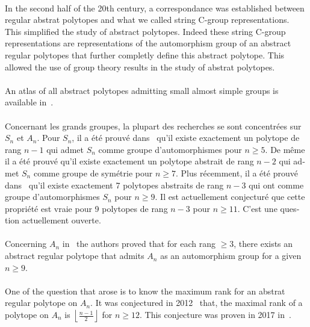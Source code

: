 \paragraph{}
In the second half of the 20th century, a correspondance was established between regular abstrat polytopes and what we called string C-group representations. This simplified the study of abstract polytopes. Indeed these string C-group representations are representations of the automorphism group of an abstract regular polytopes that further completly define this abstract polytope. This allowed the use of group theory results in the study of abstrat polytopes.

\paragraph{}
An atlas of all abstract polytopes admitting small almost simple groups is available in~\cite{atlasPolytopes}.

\begin{otherlanguage}{french}

\paragraph{}
Concernant les grands groupes, la plupart des recherches se sont concentrées sur $S_n$ et $A_n$. Pour $S_n$, il a été prouvé dans~\cite{highRankSym} qu'il existe exactement un polytope de rang $n-1$ qui admet $S_n$ comme groupe d'automorphismes pour $n \ge 5$. De même il a été prouvé qu'il existe exactement un polytope abstrait de rang $n-2$ qui admet $S_n$ comme groupe de symétrie pour $n \ge 7$. Plus récemment, il a été prouvé dans~\cite{leemansTransactions} qu'il existe exactement 7 polytopes abstraits de rang $n-3$ qui ont comme groupe d'automorphismes $S_n$ pour $n \ge 9$. Il est actuellement conjecturé que cette propriété est vraie pour 9 polytopes de rang $n-3$ pour $n \ge 11$. C'est une question actuellement ouverte.

\end{otherlanguage}

\paragraph{}
Concerning $A_n$ in~\cite{highRankAlternating} the authors proved that for each rang $\ge 3$, there exists an abstract regular polytope that admits $A_n$ as an automorphism group for a given $n \ge 9$.

\paragraph{}
One of the question that arose is to know the maximum rank for an abstrat regular polytope on $A_n$. It was conjectured in 2012~\cite{A12PolytopesRank} that, the maximal rank of a polytope on $A_n$ is $\left \lfloor \frac{n-1}{2} \right \rfloor$ for $n \ge 12$. This conjecture was proven in 2017 in~\cite{highestRankOfAn}.


